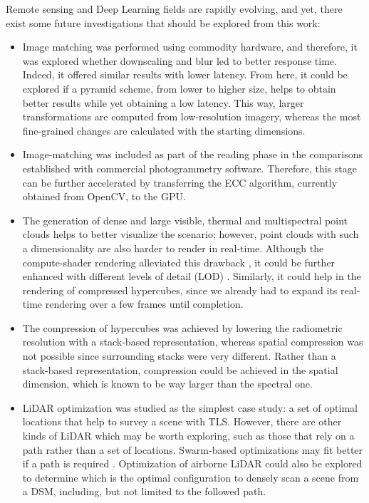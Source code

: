 Remote sensing and Deep Learning fields are rapidly evolving, and yet, there exist some future investigations that should be explored from this work:
\begin{itemize}
    \item Image matching was performed using commodity hardware, and therefore, it was explored whether downscaling and blur led to better response time. Indeed, it offered similar results with lower latency. From here, it could be explored if a pyramid scheme, from lower to higher size, helps to obtain better results while yet obtaining a low latency. This way, larger transformations are computed from low-resolution imagery, whereas the most fine-grained changes are calculated with the starting dimensions. 
    \item Image-matching was included as part of the reading phase in the comparisons established with commercial photogrammetry software. Therefore, this stage can be further accelerated by transferring the ECC algorithm, currently obtained from OpenCV, to the GPU.
    \item The generation of dense and large visible, thermal and multispectral point clouds helps to better visualize the scenario; however, point clouds with such a dimensionality are also harder to render in real-time. Although the compute-shader rendering alleviated this drawback \cite{schutz_rendering_2021}, it could be further enhanced with different levels of detail (LOD) \cite{schutz_gpu-accelerated_2023}. Similarly, it could help in the rendering of compressed hypercubes, since we already had to expand its real-time rendering over a few frames until completion.
    \item The compression of hypercubes was achieved by lowering the radiometric resolution with a stack-based representation, whereas spatial compression was not possible since surrounding stacks were very different. Rather than a stack-based representation, compression could be achieved in the spatial dimension, which is known to be way larger than the spectral one. 
    \item LiDAR optimization was studied as the simplest case study: a set of optimal locations that help to survey a scene with TLS. However, there are other kinds of LiDAR which may be worth exploring, such as those that rely on a path rather than a set of locations. Swarm-based optimizations may fit better if a path is required \cite{roberge_fast_2018}. Optimization of airborne LiDAR could also be explored to determine which is the optimal configuration to densely scan a scene from a DSM, including, but not limited to the followed path.

\end{itemize}

